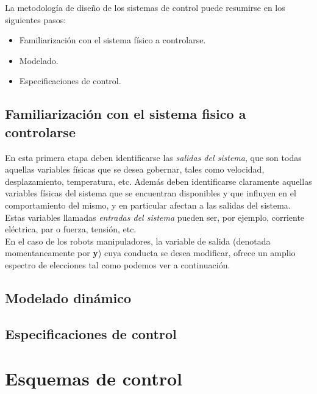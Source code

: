 La metodología de diseño de los sistemas de control puede resumirse en los siguientes pasos:

\begin{itemize}
	\item Familiarización con el sistema físico a controlarse.
	\item Modelado.
	\item Especificaciones de control.
\end{itemize}

\subsection{Familiarización con el sistema fisico a controlarse}

En esta primera etapa deben identificarse las \textit{salidas del sistema}, que son todas aquellas variables físicas que se desea gobernar, tales como velocidad, desplazamiento, temperatura, etc. Además deben identificarse claramente aquellas variables físicas del sistema que se encuentran disponibles y que influyen en el comportamiento del mismo, y en particular afectan a las salidas del sistema. Estas variables llamadas \textit{entradas del sistema} pueden ser, por ejemplo, corriente eléctrica, par o fuerza, tensión, etc.\\

En el caso de los robots manipuladores, la variable de salida (denotada momentaneamente por \textbf{y}) cuya conducta se desea modificar, ofrece un amplio espectro de elecciones tal como podemos ver a continuación.\\

\subsection{Modelado dinámico}


\subsection{Especificaciones de control}



\section{Esquemas de control}


